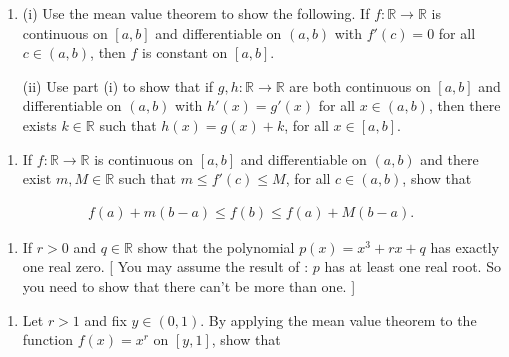 \documentclass[letterpaper,10pt,english]{jupyterBook}
\begin{document}
\label{\detokenize{Problems:id49}}\begin{enumerate}
%
\setcounter{enumi}{48}
\item {} 
\sphinxAtStartPar
(i) Use the mean value theorem to show the following. If \(f:\mathbb{R} \rightarrow \mathbb{R}\) is continuous on \([a, b]\) and differentiable on \((a, b)\) with \(f'(c)= 0\) for all \(c \in (a, b)\), then \(f\) is constant on \([a, b]\).

\sphinxAtStartPar
(ii) Use part (i) to show that if \(g, h:\mathbb{R}\to\mathbb{R}\) are both continuous on \([a, b]\) and differentiable on \((a, b)\) with \(h'(x) = g'(x)\) for all \(x \in (a, b)\), then there exists \(k \in \mathbb{R}\) such that \(h(x) = g(x) + k\), for all \(x \in [a, b]\).

\end{enumerate}
\label{\detokenize{Problems:id50}}\begin{enumerate}
%
\setcounter{enumi}{49}
\item {} 
\sphinxAtStartPar
If \(f:\mathbb{R} \rightarrow \mathbb{R}\) is continuous on \([a, b]\) and differentiable on \((a, b)\) and there exist \(m, M \in \mathbb{R}\) such that \(m \leq f'(c) \leq M\), for all \(c \in (a, b)\), show that

\end{enumerate}
\begin{equation*}
\begin{split}
f(a) + m(b - a) \leq f(b) \leq f(a) + M(b-a).
\end{split}
\end{equation*}\label{\detokenize{Problems:id51}}\begin{enumerate}
%
\setcounter{enumi}{50}
\item {} 
\sphinxAtStartPar
If \(r > 0\) and \(q \in \mathbb{R}\) show that the polynomial \(p(x) = x^{3} + rx + q\) has exactly one real zero.
{[} You may assume the result of : \(p\) has at least one real root. So you need to show that there can’t be more than one. {]}

\end{enumerate}
\label{\detokenize{Problems:id52}}\begin{enumerate}
%
\setcounter{enumi}{51}
\item {} 
\sphinxAtStartPar
Let \(r>1\) and fix \(y\in (0,1)\). By applying the mean value theorem to the function \(f(x)=x^r\) on \([y,1]\), show that

\end{enumerate}
\end{document}
